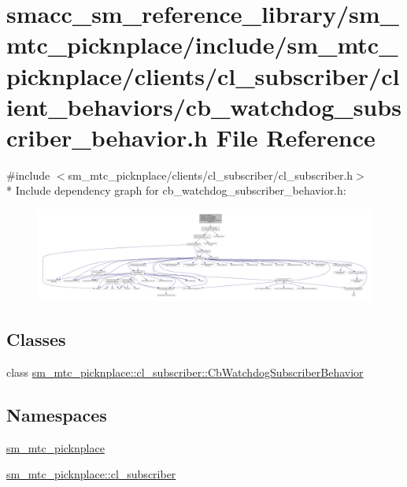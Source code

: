 \hypertarget{sm__mtc__picknplace_2include_2sm__mtc__picknplace_2clients_2cl__subscriber_2client__behaviors_2c69bb672fd14fe2f6ffe93585de7618b7}{}\section{smacc\+\_\+sm\+\_\+reference\+\_\+library/sm\+\_\+mtc\+\_\+picknplace/include/sm\+\_\+mtc\+\_\+picknplace/clients/cl\+\_\+subscriber/client\+\_\+behaviors/cb\+\_\+watchdog\+\_\+subscriber\+\_\+behavior.h File Reference}
\label{sm__mtc__picknplace_2include_2sm__mtc__picknplace_2clients_2cl__subscriber_2client__behaviors_2c69bb672fd14fe2f6ffe93585de7618b7}
{\ttfamily \#include $<$sm\+\_\+mtc\+\_\+picknplace/clients/cl\+\_\+subscriber/cl\+\_\+subscriber.\+h$>$}\\*
Include dependency graph for cb\+\_\+watchdog\+\_\+subscriber\+\_\+behavior.\+h\+:
\nopagebreak
\begin{figure}[H]
\begin{center}
\leavevmode
\includegraphics[width=350pt]{sm__mtc__picknplace_2include_2sm__mtc__picknplace_2clients_2cl__subscriber_2client__behaviors_2c644df3694cbcc7a152d8a13b1ca0651b}
\end{center}
\end{figure}
\subsection*{Classes}
\begin{DoxyCompactItemize}
\item 
class \hyperlink{classsm__mtc__picknplace_1_1cl__subscriber_1_1CbWatchdogSubscriberBehavior}{sm\+\_\+mtc\+\_\+picknplace\+::cl\+\_\+subscriber\+::\+Cb\+Watchdog\+Subscriber\+Behavior}
\end{DoxyCompactItemize}
\subsection*{Namespaces}
\begin{DoxyCompactItemize}
\item 
 \hyperlink{namespacesm__mtc__picknplace}{sm\+\_\+mtc\+\_\+picknplace}
\item 
 \hyperlink{namespacesm__mtc__picknplace_1_1cl__subscriber}{sm\+\_\+mtc\+\_\+picknplace\+::cl\+\_\+subscriber}
\end{DoxyCompactItemize}
